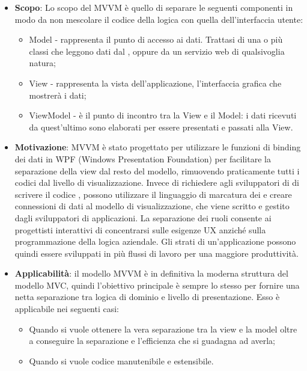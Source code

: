 		\begin{itemize}
		\item \textbf{Scopo}: Lo scopo del MVVM è quello di separare le seguenti componenti in modo da non mescolare il codice della logica con quella dell'interfaccia utente:
		\begin{itemize}
		\item Model - rappresenta il punto di accesso ai dati. Trattasi di una o più classi che leggono dati dal , oppure da un servizio web di qualsivoglia natura;
		\item View - rappresenta la vista dell’applicazione, l’interfaccia grafica che mostrerà i dati;
		\item ViewModel - è il punto di incontro tra la View e il Model: i dati ricevuti da quest’ultimo sono elaborati per essere presentati e passati alla View.
		\end{itemize}

		\item \textbf{Motivazione}: MVVM è stato progettato per utilizzare le funzioni di binding dei dati in WPF (Windows Presentation Foundation) per facilitare la separazione della view dal resto del modello, rimuovendo praticamente tutti i codici  dal livello di visualizzazione. Invece di richiedere agli sviluppatori di  di scrivere il codice , possono utilizzare il linguaggio di marcatura dei  e creare connessioni di dati al modello di visualizzazione, che viene scritto e gestito dagli sviluppatori di applicazioni. La separazione dei ruoli consente ai progettisti interattivi di concentrarsi sulle esigenze UX anziché sulla programmazione della logica aziendale. 
Gli strati di un'applicazione possono quindi essere sviluppati in più flussi di lavoro per una maggiore produttività.
\item \textbf{Applicabilità}: il modello MVVM è in definitiva la moderna struttura del modello MVC, quindi l'obiettivo principale è sempre lo stesso per fornire una netta separazione tra logica di dominio e livello di presentazione. Esso è applicabile nei seguenti casi:
\begin{itemize}
\item Quando si vuole ottenere la vera separazione tra la view e la model oltre a conseguire la separazione e l'efficienza che si guadagna ad averla;
\item Quando si vuole codice manutenibile e estensibile.
\end{itemize}
		\end{itemize}

